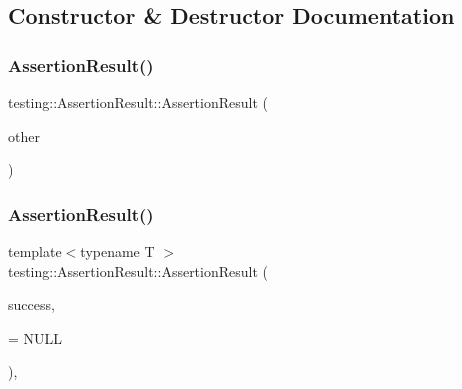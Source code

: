 \subsection{Constructor \& Destructor Documentation}
\mbox{\label{classtesting_1_1_assertion_result_a27788116f03f90aec4daf592fd809ead}} 
\subsubsection{\texorpdfstring{Assertion\+Result()}{AssertionResult()}\hspace{0.1cm}{\footnotesize\ttfamily [1/2]}}
{\footnotesize\ttfamily testing\+::\+Assertion\+Result\+::\+Assertion\+Result (\begin{DoxyParamCaption}\item[{const \hyperlink{classtesting_1_1_assertion_result}{Assertion\+Result} \&}]{other }\end{DoxyParamCaption})}

\mbox{\label{classtesting_1_1_assertion_result_a9b8d1d6d0a979d0769ed4ff97d06c4e3}} 
\subsubsection{\texorpdfstring{Assertion\+Result()}{AssertionResult()}\hspace{0.1cm}{\footnotesize\ttfamily [2/2]}}
{\footnotesize\ttfamily template$<$typename T $>$ \\
testing\+::\+Assertion\+Result\+::\+Assertion\+Result (\begin{DoxyParamCaption}\item[{const T \&}]{success,  }\item[{typename \hyperlink{structtesting_1_1internal_1_1_enable_if}{internal\+::\+Enable\+If}$<$ !\hyperlink{classtesting_1_1internal_1_1_implicitly_convertible}{internal\+::\+Implicitly\+Convertible}$<$ T, \hyperlink{classtesting_1_1_assertion_result}{Assertion\+Result} $>$\+::value $>$\+::type $\ast$}]{ = {\ttfamily NULL} }\end{DoxyParamCaption})\hspace{0.3cm}{\ttfamily [inline]}, {\ttfamily [explicit]}}



